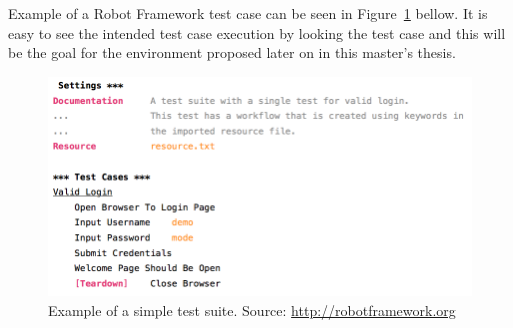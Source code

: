 Example of a Robot Framework test case can be seen in Figure~\ref{fig:robot_example} bellow. It is easy to see the intended test case execution by looking the test case and this will be the goal for the environment proposed later on in this master's thesis.

\begin{figure}[ht]
  \begin{center}
    \includegraphics[width=12cm]{images/robot_example.png}
    \caption{Example of a simple test suite. Source: \url{http://robotframework.org}}
    \label{fig:robot_example}
  \end{center}
\end{figure}
